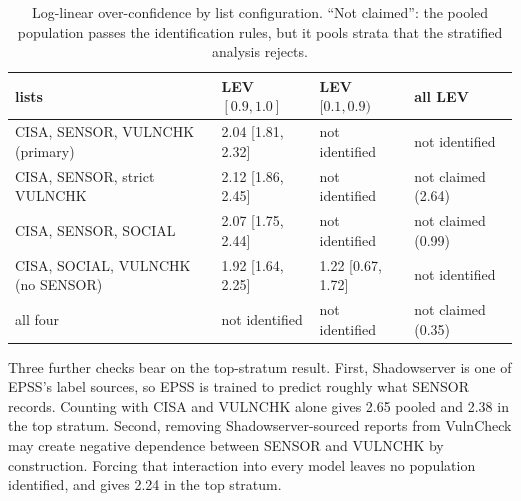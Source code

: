 \begin{table}[t]
\centering\small
\caption{Log-linear over-confidence by list configuration. ``Not claimed'':
the pooled population passes the identification rules, but it pools strata
that the stratified analysis rejects.}\label{tab:config}
\begin{tabular}{@{}llll@{}}
\toprule
lists & LEV $[0.9, 1.0]$ & LEV $[0.1, 0.9)$ & all LEV \\
\midrule
CISA, SENSOR, VULNCHK (primary) & 2.04\x{} [1.81, 2.32] & not identified & not identified \\
CISA, SENSOR, strict VULNCHK & 2.12\x{} [1.86, 2.45] & not identified & not claimed (2.64\x) \\
CISA, SENSOR, SOCIAL & 2.07\x{} [1.75, 2.44] & not identified & not claimed (0.99\x) \\
CISA, SOCIAL, VULNCHK (no SENSOR) & 1.92\x{} [1.64, 2.25] & 1.22\x{} [0.67, 1.72] & not identified \\
all four & not identified & not identified & not claimed (0.35\x) \\
\bottomrule
\end{tabular}
\end{table}

Three further checks bear on the top-stratum result. First, Shadowserver is
one of EPSS's label sources, so EPSS is trained to predict roughly what SENSOR
records. Counting with CISA and VULNCHK alone gives 2.65 pooled and 2.38 in the
top stratum. Second, removing Shadowserver-sourced reports from VulnCheck may
create negative dependence between SENSOR and VULNCHK by construction. Forcing
that interaction into every model leaves no population identified, and gives
2.24 in the top stratum.


